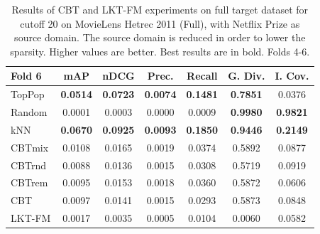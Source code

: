 \begin{table}[hbt]
\begin{tabulary}{\textwidth}{|L|CCCCCC|}
\hline
\hline
Fold 6 & mAP & nDCG & Prec. & Recall & G. Div. & I. Cov. \\
\hline
TopPop & \textbf{0.0514} &\textbf{0.0723} &\textbf{0.0074} &\textbf{0.1481} &\textbf{0.7851} & 0.0376 \\
Random & 0.0001 & 0.0003 & 0.0000 & 0.0009 &\textbf{0.9980} & \textbf{0.9821} \\
kNN & \textbf{0.0670} &\textbf{0.0925} &\textbf{0.0093} &\textbf{0.1850} &\textbf{0.9446} & \textbf{0.2149} \\
CBTmix & 0.0108 & 0.0165 & 0.0019 & 0.0374 & 0.5892 & 0.0877 \\
CBTrnd & 0.0088 & 0.0136 & 0.0015 & 0.0308 & 0.5719 & 0.0919 \\
CBTrem & 0.0095 & 0.0153 & 0.0018 & 0.0360 & 0.5872 & 0.0606 \\
CBT & 0.0097 & 0.0141 & 0.0015 & 0.0293 & 0.5873 & 0.0848 \\
LKT-FM & 0.0017 &           0.0035 &           0.0005 &           0.0104 &                                            0.0060 &                                            0.0582 \\
\hline
\end{tabulary}
\caption{Results of CBT and LKT-FM experiments on full target dataset for cutoff 20 on MovieLens Hetrec 2011 (Full), with Netflix Prize as source domain. The source domain is reduced in order to lower the sparsity. Higher values are better. Best results are in bold. Folds 4-6.}
\end{table}

